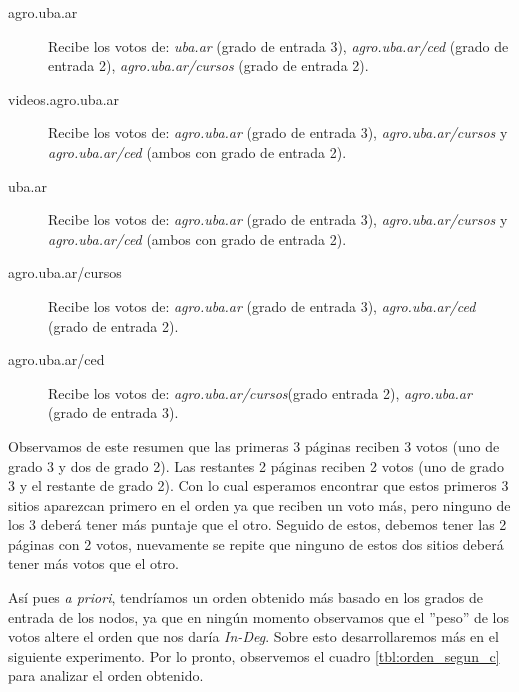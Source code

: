 \smallskip
\begin{description}
    \item[agro.uba.ar] Recibe los votos de: \emph{uba.ar} (grado de entrada
        3), \emph{agro.uba.ar/ced} (grado de entrada 2),
        \emph{agro.uba.ar/cursos} (grado de entrada 2).\smallskip

    \item[videos.agro.uba.ar] Recibe los votos de: \emph{agro.uba.ar} (grado de
        entrada 3), \emph{agro.uba.ar/cursos} y \emph{agro.uba.ar/ced} (ambos
        con grado de entrada 2).\smallskip

    \item[uba.ar] Recibe los votos de: \emph{agro.uba.ar} (grado de entrada 3),
        \emph{agro.uba.ar/cursos} y \emph{agro.uba.ar/ced} (ambos con grado de
        entrada 2).\smallskip

    \item[agro.uba.ar/cursos] Recibe los votos de: \emph{agro.uba.ar} (grado de
        entrada 3), \emph{agro.uba.ar/ced} (grado de entrada 2).\smallskip

    \item[agro.uba.ar/ced] Recibe los votos de: \emph{agro.uba.ar/cursos}(grado
        entrada 2), \emph{agro.uba.ar} (grado de entrada 3).
\end{description}
\medskip

\par Observamos de este resumen que las primeras 3 p\'aginas reciben 3 votos
(uno de grado 3 y dos de grado 2). Las restantes 2 p\'aginas reciben 2 votos
(uno de grado 3 y el restante de grado 2). Con lo cual esperamos encontrar que
estos primeros 3 sitios aparezcan primero en el orden ya que reciben un voto
m\'as, pero ninguno de los 3 deber\'a tener m\'as puntaje que el otro. Seguido
de estos, debemos tener las 2 p\'aginas con 2 votos, nuevamente se repite que
ninguno de estos dos sitios deber\'a tener m\'as votos que el otro.

\par As\'i pues \textit{a priori}, tendr\'iamos un orden obtenido m\'as basado
en los grados de entrada de los nodos, ya que en ning\'un momento observamos que
el ''peso'' de los votos altere el orden que nos dar\'ia \emph{In-Deg}. Sobre
esto desarrollaremos m\'as en el siguiente experimento. Por lo pronto,
observemos el cuadro \ref{tbl:orden_segun_c} para analizar el orden obtenido.

